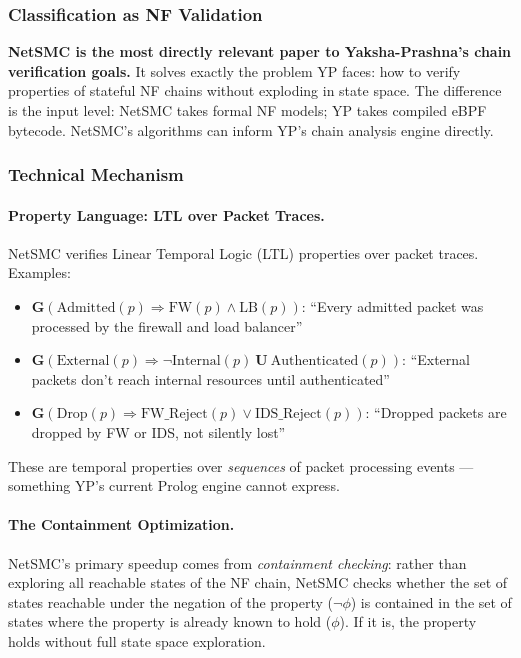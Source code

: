 \subsubsection{Classification as NF Validation}

\textbf{NetSMC is the most directly relevant paper to Yaksha-Prashna's chain verification goals.} It solves exactly the problem YP faces: how to verify properties of stateful NF chains without exploding in state space. The difference is the input level: NetSMC takes formal NF models; YP takes compiled eBPF bytecode. NetSMC's algorithms can inform YP's chain analysis engine directly.

\subsubsection{Technical Mechanism}

\paragraph{Property Language: LTL over Packet Traces.}
NetSMC verifies Linear Temporal Logic (LTL) properties over packet traces. Examples:
\begin{itemize}
  \item $\mathbf{G}(\text{Admitted}(p) \Rightarrow \text{FW}(p) \wedge \text{LB}(p))$: ``Every admitted packet was processed by the firewall and load balancer''
  \item $\mathbf{G}(\text{External}(p) \Rightarrow \neg\text{Internal}(p)\ \mathbf{U}\ \text{Authenticated}(p))$: ``External packets don't reach internal resources until authenticated''
  \item $\mathbf{G}(\text{Drop}(p) \Rightarrow \text{FW\_Reject}(p) \vee \text{IDS\_Reject}(p))$: ``Dropped packets are dropped by FW or IDS, not silently lost''
\end{itemize}
These are temporal properties over \emph{sequences} of packet processing events --- something YP's current Prolog engine cannot express.

\paragraph{The Containment Optimization.}
NetSMC's primary speedup comes from \emph{containment checking}: rather than exploring all reachable states of the NF chain, NetSMC checks whether the set of states reachable under the negation of the property ($\neg \phi$) is contained in the set of states where the property is already known to hold ($\phi$). If it is, the property holds without full state space exploration.

